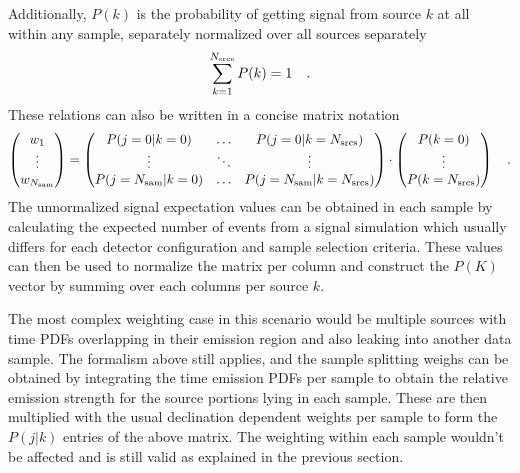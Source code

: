 Additionally, $P(k)$ is the probability of getting signal from source $k$ at all within any sample, separately normalized over all sources separately
\begin{equation}
  \sum_{k=1}^{N_\text{srcs}} P(k) = 1
  \quad\text{.}
\end{equation}
These relations can also be written in a concise matrix notation
\begin{equation}
  \begin{pmatrix} w_1 \\ \vdots \\ w_{N_\text{sam}} \end{pmatrix} =
    \begin{pmatrix}
      P(j=0|k=0) & \dots & P(j=0|k=N_\text{srcs}) \\
      \vdots & \ddots & \vdots \\
      P(j=N_\text{sam}|k=0) & \dots & P(j=N_\text{sam}|k=N_\text{srcs})
    \end{pmatrix} \cdot
    \begin{pmatrix}
      P(k=0) \\ \vdots \\ P(k=N_\text{srcs})
    \end{pmatrix}
  \quad\text{.}
\end{equation}
The unnormalized signal expectation values can be obtained in each sample by calculating the expected number of events from a signal simulation which usually differs for each detector configuration and sample selection criteria.
These values can then be used to normalize the matrix per column and construct the $P(K)$ vector by summing over each columns per source $k$.

The most complex weighting case in this scenario would be multiple sources with time PDFs overlapping in their emission region and also leaking into another data sample.
The formalism above still applies, and the sample splitting weighs can be obtained by integrating the time emission PDFs per sample to obtain the relative emission strength for the source portions lying in each sample.
These are then multiplied with the usual declination dependent weights per sample to form the $P(j|k)$ entries of the above matrix.
The weighting within each sample wouldn't be affected and is still valid as explained in the previous section.

